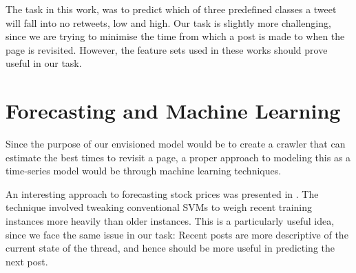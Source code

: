 The task in this work, was to predict which of three predefined classes a tweet 
will fall into no retweets, low and high. Our task is slightly more challenging, 
since we are trying to minimise the time from which a post is made to when the 
page is revisited. However, the feature sets used in these works should prove 
useful in our task.  

\section{Forecasting and Machine Learning}
Since the purpose of our envisioned model would be to create a crawler that can estimate the best times to revisit a page, a proper approach to modeling this as a time-series model would be through machine learning techniques.

An interesting approach to forecasting stock prices was presented in . The technique involved tweaking conventional SVMs to weigh recent training instances more heavily than older instances. This is a particularly useful idea, since we face the same issue in our task: Recent posts are more descriptive of the current state of the thread, and hence should be more useful in predicting the next post.




